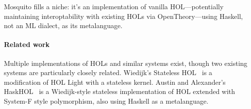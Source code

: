 \documentclass{llncs}
\begin{document}
Mosquito fills a niche: it's an implementation of vanilla HOL---potentially maintaining interoptability with existing HOLs via OpenTheory---using Haskell, not an ML dialect, as its metalanguage.

\paragraph{Related work}
Multiple implementations of HOLs and similar systems exist, though two existing systems are particularly closely related.
Wiedijk's Stateless HOL~\cite{wiedijk:stateless:2011} is a modification of HOL Light with a stateless kernel.
Austin and Alexander's HaskHOL~\cite{austin:stateless:2013} is a Wiedijk-style stateless implementation of HOL extended with System-F style polymorphism, also using Haskell as a metalanguage.
\end{document}
